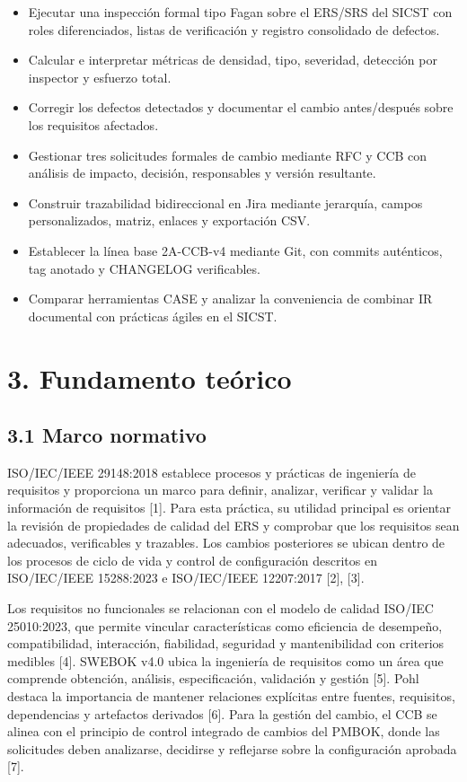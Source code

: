 \documentclass[12pt]{article}
\begin{document}
\begin{itemize}
\item Ejecutar una inspección formal tipo Fagan sobre el ERS/SRS del SICST con roles diferenciados, listas de verificación y registro consolidado de defectos.
\item Calcular e interpretar métricas de densidad, tipo, severidad, detección por inspector y esfuerzo total.
\item Corregir los defectos detectados y documentar el cambio antes/después sobre los requisitos afectados.
\item Gestionar tres solicitudes formales de cambio mediante RFC y CCB con análisis de impacto, decisión, responsables y versión resultante.
\item Construir trazabilidad bidireccional en Jira mediante jerarquía, campos personalizados, matriz, enlaces y exportación CSV.
\item Establecer la línea base 2A-CCB-v4 mediante Git, con commits auténticos, tag anotado y CHANGELOG verificables.
\item Comparar herramientas CASE y analizar la conveniencia de combinar IR documental con prácticas ágiles en el SICST.
\end{itemize}

\section{\texorpdfstring{3. Fundamento teórico}{3. Fundamento teórico}}\label{fundamento-teuxf3rico}

\subsection{\texorpdfstring{3.1 Marco normativo}{3.1 Marco normativo}}\label{marco-normativo}

ISO/IEC/IEEE 29148:2018 establece procesos y prácticas de ingeniería de requisitos y proporciona un marco para definir, analizar, verificar y validar la información de requisitos {[}1{]}. Para esta práctica, su utilidad principal es orientar la revisión de propiedades de calidad del ERS y comprobar que los requisitos sean adecuados, verificables y trazables. Los cambios posteriores se ubican dentro de los procesos de ciclo de vida y control de configuración descritos en ISO/IEC/IEEE 15288:2023 e ISO/IEC/IEEE 12207:2017 {[}2{]}, {[}3{]}.

Los requisitos no funcionales se relacionan con el modelo de calidad ISO/IEC 25010:2023, que permite vincular características como eficiencia de desempeño, compatibilidad, interacción, fiabilidad, seguridad y mantenibilidad con criterios medibles {[}4{]}. SWEBOK v4.0 ubica la ingeniería de requisitos como un área que comprende obtención, análisis, especificación, validación y gestión {[}5{]}. Pohl destaca la importancia de mantener relaciones explícitas entre fuentes, requisitos, dependencias y artefactos derivados {[}6{]}. Para la gestión del cambio, el CCB se alinea con el principio de control integrado de cambios del PMBOK, donde las solicitudes deben analizarse, decidirse y reflejarse sobre la configuración aprobada {[}7{]}.
\end{document}
